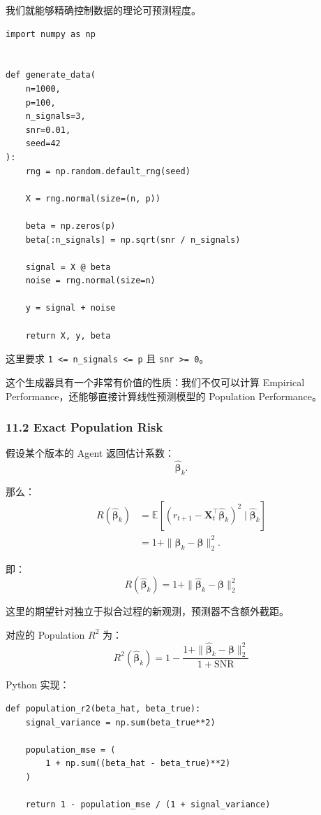 我们就能够精确控制数据的理论可预测程度。

\begin{verbatim}
import numpy as np


def generate_data(
    n=1000,
    p=100,
    n_signals=3,
    snr=0.01,
    seed=42
):
    rng = np.random.default_rng(seed)

    X = rng.normal(size=(n, p))

    beta = np.zeros(p)
    beta[:n_signals] = np.sqrt(snr / n_signals)

    signal = X @ beta
    noise = rng.normal(size=n)

    y = signal + noise

    return X, y, beta
\end{verbatim}

这里要求 \texttt{1\ \textless{}=\ n\_signals\ \textless{}=\ p} 且 \texttt{snr\ \textgreater{}=\ 0}。

这个生成器具有一个非常有价值的性质：我们不仅可以计算 Empirical Performance，还能够直接计算线性预测模型的 Population Performance。

\hypertarget{part-4-60-0001-exact-population-risk}{%
\subsubsection{11.2 Exact Population Risk}\label{part-4-60-0001-exact-population-risk}}

假设某个版本的 Agent 返回估计系数：
\[\hat{\boldsymbol\beta}_k.\]

那么：
\[\begin{aligned}
R(\hat{\boldsymbol\beta}_k)
&=
\mathbb E\left[
(r_{t+1}
-\boldsymbol X_t^\top
\hat{\boldsymbol\beta}_k)^2
\mid \hat{\boldsymbol\beta}_k
\right]\\
&=
1+
\|\hat{\boldsymbol\beta}_k
-\boldsymbol\beta\|_2^2.
\end{aligned}\]

即：
\[\boxed{
R(\hat{\boldsymbol\beta}_k)
=
1+
\|\hat{\boldsymbol\beta}_k
-\boldsymbol\beta\|_2^2
}\]

这里的期望针对独立于拟合过程的新观测，预测器不含额外截距。

对应的 Population \(R^2\) 为：
\[\boxed{
R^2(\hat{\boldsymbol\beta}_k)
=
1-
\frac{
1+\|\hat{\boldsymbol\beta}_k
-\boldsymbol\beta\|_2^2
}{
1+\mathrm{SNR}
}
}\]

Python 实现：

\begin{verbatim}
def population_r2(beta_hat, beta_true):
    signal_variance = np.sum(beta_true**2)

    population_mse = (
        1 + np.sum((beta_hat - beta_true)**2)
    )

    return 1 - population_mse / (1 + signal_variance)
\end{verbatim}

